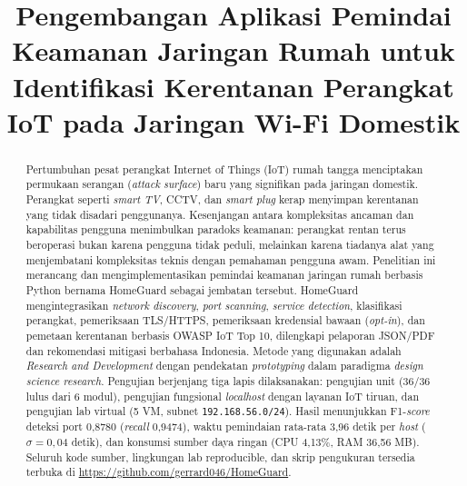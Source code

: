 \documentclass[conference]{IEEEtran}
\begin{document}
\title{Pengembangan Aplikasi Pemindai Keamanan Jaringan Rumah untuk
Identifikasi Kerentanan Perangkat IoT pada Jaringan Wi-Fi Domestik}

\author{
}

\maketitle

\begin{abstract}
Pertumbuhan pesat perangkat Internet of Things (IoT) rumah tangga
menciptakan permukaan serangan (\textit{attack surface}) baru yang
signifikan pada jaringan domestik. Perangkat seperti \textit{smart TV},
CCTV, dan \textit{smart plug} kerap menyimpan kerentanan yang tidak
disadari penggunanya. Kesenjangan antara kompleksitas ancaman dan
kapabilitas pengguna menimbulkan paradoks keamanan: perangkat rentan
terus beroperasi bukan karena pengguna tidak peduli, melainkan karena
tiadanya alat yang menjembatani kompleksitas teknis dengan pemahaman
pengguna awam. Penelitian ini merancang dan mengimplementasikan pemindai
keamanan jaringan rumah berbasis Python bernama HomeGuard sebagai jembatan
tersebut. HomeGuard mengintegrasikan \textit{network discovery}, \textit{port
scanning}, \textit{service detection}, klasifikasi perangkat, pemeriksaan
TLS/HTTPS, pemeriksaan kredensial bawaan (\textit{opt-in}), dan pemetaan
kerentanan berbasis OWASP IoT Top 10, dilengkapi pelaporan JSON/PDF dan
rekomendasi mitigasi berbahasa Indonesia. Metode yang digunakan adalah
\textit{Research and Development} dengan pendekatan \textit{prototyping}
dalam paradigma \textit{design science research}. Pengujian berjenjang tiga
lapis dilaksanakan: pengujian unit (36/36 lulus dari 6 modul), pengujian
fungsional \textit{localhost} dengan layanan IoT tiruan, dan pengujian lab
virtual (5 VM, subnet \texttt{192.168.56.0/24}). Hasil menunjukkan
F1-\textit{score} deteksi port 0,8780 (\textit{recall} 0,9474), waktu
pemindaian rata-rata 3,96 detik per \textit{host} ($\sigma{=}0{,}04$ detik),
dan konsumsi sumber daya ringan (CPU 4,13\%, RAM 36,56 MB). Seluruh kode
sumber, lingkungan lab reproducible, dan skrip pengukuran tersedia terbuka
di \url{https://github.com/gerrard046/HomeGuard}.
\end{abstract}
\end{document}
